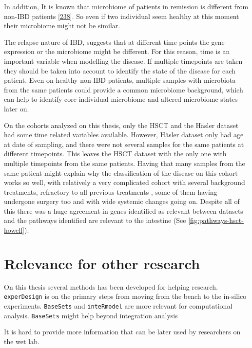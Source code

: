 \documentclass[
  a4paper,
]{book}
\begin{document}
In addition, It is known that microbiome of patients in remission is different from non-IBD patients {[}\protect\hyperlink{ref-halfvarson2017}{238}{]}.
So even if two individual seem healthy at this moment their microbiome might not be similar.

The relapse nature of IBD, suggests that at different time points the gene expression or the microbiome might be different.
For this reason, time is an important variable when modelling the disease.
If multiple timepoints are taken they should be taken into account to identify the state of the disease for each patient.
Even on healthy non-IBD patients, multiple samples with microbiota from the same patients could provide a common microbiome background, which can help to identify core individual microbiome and altered microbiome states later on.

On the cohorts analyzed on this thesis, only the HSCT and the Häsler dataset had some time related variables available.
However, Häsler dataset only had age at date of sampling, and there were not several samples for the same patients at different timepoints.
This leaves the HSCT dataset with the only one with multiple timepoints from the same patients.
Having that many samples from the same patient might explain why the classification of the disease on this cohort works so well, with relatively a very complicated cohort with several background treatments, refractory to all previous treatments , some of them having undergone surgery too and with wide systemic changes going on.
Despite all of this there was a huge agreement in genes identified as relevant between datasets and the pathways identified are relevant to the intestine (See \ref{fig:pathways-hsct-howell}).

\hypertarget{relevance-for-other-research}{%
\section{Relevance for other research}\label{relevance-for-other-research}}

On this thesis several methods has been developed for helping research.
\texttt{experDesign} is on the primary steps from moving from the bench to the in-silico experiments.
\texttt{BaseSets} and \texttt{inteRmodel} are more relevant for computational analysis.
\texttt{BaseSets} might help beyond integration analysis

It is hard to provide more information that can be later used by researchers on the wet lab.
\end{document}

